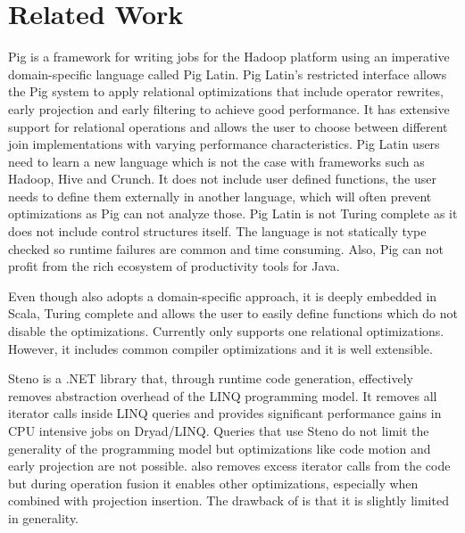 \section{Related Work}
\label{sec:related-work}

Pig \cite{olston_pig_2008-1} is a framework for writing jobs for the Hadoop
platform using an imperative domain-specific language called Pig Latin. Pig
Latin's restricted interface allows the Pig system to apply relational
optimizations that include operator rewrites, early projection and early
filtering to achieve good performance.
It has extensive support for relational operations and allows the user to choose
between different join implementations with varying performance characteristics.
Pig Latin users need to learn a new language which is not the case with
frameworks such as Hadoop, Hive and Crunch. It does not include user defined
functions, the user needs to define them externally in another language, which
will often prevent optimizations as Pig can not analyze those. Pig Latin is not
Turing complete as it does not include control structures itself.
The language is not statically type checked so runtime failures are common and
time consuming. Also, Pig can not profit from the rich ecosystem
of productivity tools for Java.

Even though \tool also adopts a domain-specific approach, it is deeply embedded
in Scala, Turing complete and allows the user to easily define functions which
do not disable the optimizations. Currently \tool only supports one relational
optimizations. However, it includes common compiler optimizations and it is well
extensible.

Steno \cite{murray_steno:_2011} is a .NET library that, through runtime code
generation, effectively removes abstraction overhead of the LINQ programming
model. It removes all iterator calls inside LINQ queries and provides
significant performance gains in CPU intensive jobs on Dryad/LINQ. Queries that
use Steno do not limit the generality of the programming model but optimizations
like code motion and early projection are not possible.
\tool also removes excess iterator calls from the code but during operation
fusion it enables other optimizations, especially when combined with projection
insertion. The drawback of \tool is that it is slightly limited in generality.

